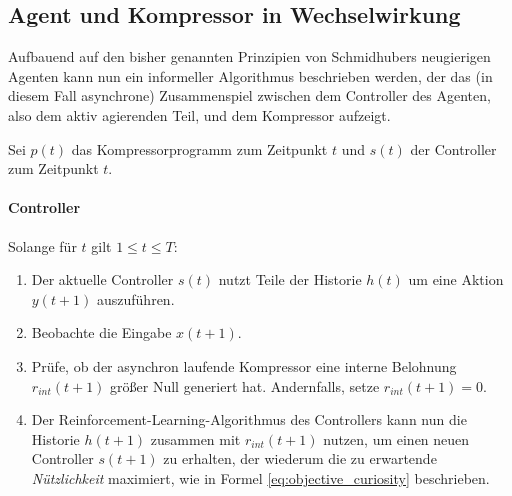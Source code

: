 \subsection{Agent und Kompressor in Wechselwirkung}

Aufbauend auf den bisher genannten Prinzipien von Schmidhubers neugierigen Agenten kann nun ein informeller Algorithmus beschrieben werden, der das (in diesem Fall asynchrone) Zusammenspiel zwischen dem Controller des Agenten, also dem aktiv agierenden Teil, und dem Kompressor aufzeigt.

Sei \(p(t)\) das Kompressorprogramm zum Zeitpunkt \(t\) und \(s(t)\) der Controller zum Zeitpunkt \(t\).

\paragraph{Controller} Solange für  \(t\) gilt \(1 \leq t \leq T\): 
\begin{enumerate}
  \item Der aktuelle Controller \(s(t)\) nutzt Teile der Historie \(h(t)\) um eine Aktion \(y(t+1)\) auszuführen.
  \item Beobachte die Eingabe \(x(t+1)\).
  \item Prüfe, ob der asynchron laufende Kompressor eine interne Belohnung \(r_{int}(t+1)\) größer Null generiert hat. Andernfalls, setze \(r_{int}(t+1) = 0\).
  \item Der Reinforcement-Learning-Algorithmus des Controllers kann nun die Historie \(h(t+1)\) zusammen mit \(r_{int}(t+1)\) nutzen, um einen neuen Controller \(s(t+1)\) zu erhalten, der wiederum die zu erwartende \emph{Nützlichkeit} maximiert, wie in Formel \eqref{eq:objective_curiosity} beschrieben.
\end{enumerate}

